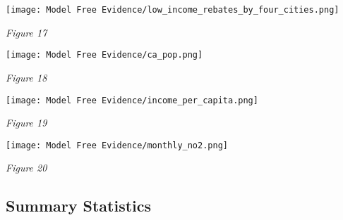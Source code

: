 \documentclass[12pt]{article}
\newenvironment{Figure}
{\par\medskip\noindent\minipage{\linewidth}}
{\endminipage\par\medskip}
\begin{document}
	
	\begin{Figure}
		\centering
		\texttt{[image: Model Free Evidence/low\_income\_rebates\_by\_four\_cities.png]}
		
	\end{Figure}
	\begin{center}
		\emph{Figure 17}\\
	\end{center}
	\newpage
	\begin{multicols}{2}
		\begin{Figure}
			\centering
			\texttt{[image: Model Free Evidence/ca\_pop.png]}
			
		\end{Figure}
		\begin{center}
			\emph{Figure 18}\\
		\end{center}
		
		\begin{Figure}
			\centering
			\texttt{[image: Model Free Evidence/income\_per\_capita.png]}
			
		\end{Figure}
		\begin{center}
			\emph{Figure 19}\\
		\end{center}
		
	\end{multicols}
	\begin{Figure}
		\centering
		\texttt{[image: Model Free Evidence/monthly\_no2.png]}
		
	\end{Figure}
	\begin{center}
		\emph{Figure 20}\\
	\end{center}
	
	
	
	\clearpage
	\subsection*{Summary Statistics}
	
\end{document}

